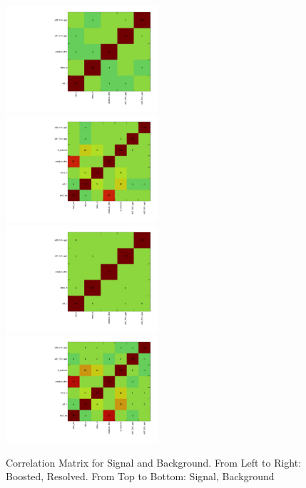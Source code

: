 \begin{figure}[!ht]
  \centering
  \includegraphics[width=0.5\textwidth]{analysis_plots/tmva_plots/zv_BDTG14_CorrelationMatrixS.pdf} \hspace{-10pt}
  \includegraphics[width=0.5\textwidth]{analysis_plots/tmva_plots/zjj_BDTG14_CorrelationMatrixS.pdf} \hspace{-10pt} \\
  \includegraphics[width=0.5\textwidth]{analysis_plots/tmva_plots/zv_BDTG14_CorrelationMatrixB.pdf} \hspace{-10pt}
  \includegraphics[width=0.5\textwidth]{analysis_plots/tmva_plots/zjj_BDTG14_CorrelationMatrixB.pdf} \hspace{-10pt} \\
  \caption[Correlation Matrix for Signal and Background]%
  {Correlation Matrix for Signal and Background. From Left to Right: Boosted, Resolved.
    From Top to Bottom: Signal, Background}%
  \label{fig:vbs-training-correlation}
\end{figure}

